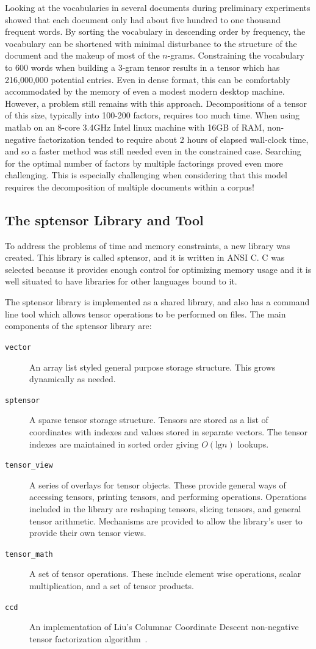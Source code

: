 \documentclass[../ut-dissertation.tex]{subfiles}
\begin{document}
Looking at the vocabularies in several documents during preliminary
experiments showed that each document only had about five hundred to
one thousand frequent words.  By sorting the vocabulary in descending
order by frequency, the vocabulary can be shortened with minimal
disturbance to the structure of the document and the makeup of most of
the $n$-grams.  Constraining the vocabulary to 600 words when building
a 3-gram tensor results in a tensor which has 216,000,000 potential
entries.  Even in dense format, this can be comfortably accommodated
by the memory of even a modest modern desktop machine.  However, a
problem still remains with this approach.  Decompositions of a tensor
of this size, typically into 100-200 factors, requires too much time.
When using matlab on an 8-core 3.4GHz Intel linux machine with 16GB of
RAM, non-negative factorization tended to require about 2 hours of
elapsed wall-clock time, and so a faster method was still needed even
in the constrained case.  Searching for the optimal number of factors
by multiple factorings proved even more challenging.  This is
especially challenging when considering that this model requires the
decomposition of multiple documents within a corpus!

\subsection{The sptensor Library and Tool}
To address the problems of time and memory constraints, a new library
was created.  This library is called sptensor, and it is written in
ANSI C.  C was selected because it provides enough control for
optimizing memory usage and it is well situated to have libraries for
other languages bound to it.

The sptensor library is implemented as a shared library, and also has a
command line tool which allows tensor operations to be performed on
files.  The main components of the sptensor library are:
\begin{description}
\item[{\tt vector}] An array list styled general purpose storage structure.
  This grows dynamically as needed.
\item[{\tt sptensor}] A sparse tensor storage structure.  Tensors are stored
  as a list of coordinates with indexes and values stored in separate
  vectors.  The tensor indexes are maintained in sorted order giving
  $O(\mathrm{lg} n)$ lookups.
\item[{\tt tensor\_view}] A series of overlays for tensor objects.  These
  provide general ways of accessing tensors, printing tensors, and
  performing operations.  Operations included in the library are
  reshaping tensors, slicing tensors, and general tensor arithmetic.
  Mechanisms are provided to allow the library's user to provide their
  own tensor views.
\item[{\tt tensor\_math}] A set of tensor operations.  These include
  element wise operations, scalar multiplication, and a set of tensor
  products.
\item[{\tt ccd}] An implementation of Liu's Columnar Coordinate
  Descent non-negative tensor factorization algorithm~\cite{liu2012sparse}.
\end{description}
\end{document}
